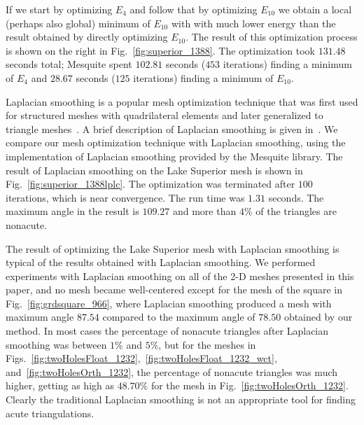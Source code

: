 \documentclass[final]{siamltex}
\begin{document}
If we start by optimizing $E_{4}$ and follow that by optimizing
$E_{10}$ we obtain a local (perhaps also global) minimum of $E_{10}$
with with much lower energy than the result obtained by directly
optimizing $E_{10}$.  The result of this optimization process is
shown on the right in Fig.~\ref{fig:superior_1388}.  The optimization
took $131.48$ seconds total; Mesquite spent $102.81$ seconds ($453$
iterations) finding a minimum of $E_{4}$ and $28.67$ seconds ($125$
iterations) finding a minimum of $E_{10}$.


Laplacian smoothing is a popular mesh optimization technique
that was first used for structured meshes with quadrilateral
elements and later generalized to triangle meshes~\cite{Winslow1964}.
A brief description of Laplacian smoothing is given
in~\cite{Field1988}.  We compare our mesh optimization
technique with Laplacian smoothing,
using the implementation of Laplacian smoothing provided by
the Mesquite library.  The result of Laplacian smoothing
on the Lake Superior mesh is shown in
Fig.~\ref{fig:superior_1388lplc}.  The optimization was
terminated after $100$ iterations, which is near convergence.
The run time was $1.31$ seconds.  
The maximum angle in the result is $109.27$\textdegree{}
and more than $4\%$ of the triangles are nonacute.

The result of optimizing the Lake Superior mesh with Laplacian
smoothing is typical of the results obtained
with Laplacian smoothing.  We performed
experiments with Laplacian smoothing on all of the
2-D meshes presented in this paper, and no mesh became
well-centered except for the mesh of the square
in Fig.~\ref{fig:grdsquare_966}, where Laplacian smoothing
produced a mesh with maximum angle $87.54$\textdegree{}
compared to the maximum angle of $78.50$\textdegree{} obtained
by our method.  In most cases the percentage of nonacute
triangles after Laplacian smoothing was between $1\%$ and
$5\%$, but for the meshes in
Figs.~\ref{fig:twoHolesFloat_1232},~\ref{fig:twoHolesFloat_1232_wct},
and~\ref{fig:twoHolesOrth_1232}, the percentage of nonacute
triangles was much higher, getting as high as
$48.70\%$ for the mesh in Fig.~\ref{fig:twoHolesOrth_1232}.
Clearly the traditional Laplacian smoothing is not an
appropriate tool for finding acute triangulations.
\end{document}
